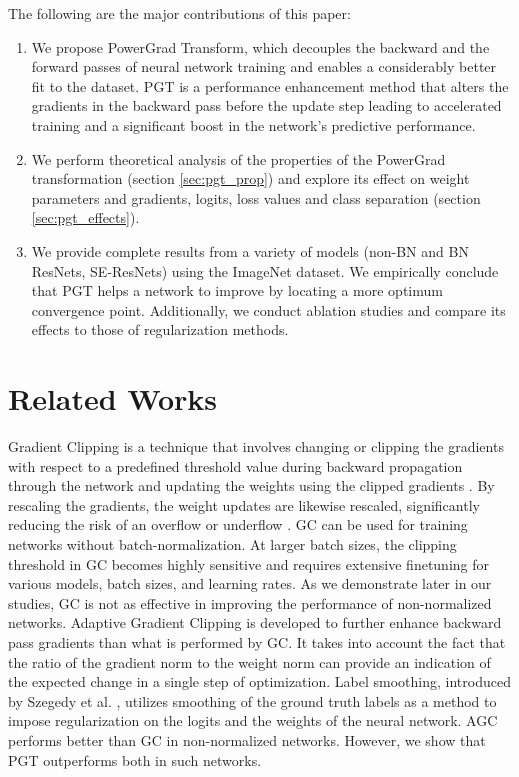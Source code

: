 \documentclass[runningheads]{llncs}
\begin{document}
The following are the major contributions of this paper:

\begin{enumerate}

\item We propose PowerGrad Transform, which decouples the backward and the forward
passes of neural network training and enables a considerably better fit to the dataset.
PGT is a performance enhancement method that alters the gradients in the backward pass
before the update step leading to accelerated training and a significant boost in the
network's predictive performance.

\item We perform theoretical analysis of the properties of the PowerGrad transformation
(section \ref{sec:pgt_prop}) and explore its effect on weight parameters and gradients,
logits, loss values and class separation (section \ref{sec:pgt_effects}).

\item We provide complete results from a variety of models (non-BN and BN ResNets,
SE-ResNets) using the ImageNet dataset. We empirically conclude that PGT helps a network
to improve by locating a more optimum convergence point. Additionally, we conduct
ablation studies and compare its effects to those of regularization methods.

\end{enumerate}

\section{Related Works}
\label{sec:Rela}


Gradient Clipping \cite{pascanu2013difficulty} is a technique that involves changing or
clipping the gradients with respect to a predefined threshold value during backward
propagation through the network and updating the weights using the clipped gradients
\cite{zhang2019gradient}\cite{smith2020generalization}. By rescaling the gradients, the
weight updates are likewise rescaled, significantly reducing the risk of an overflow or
underflow \cite{pascanu2012understanding}. GC can be used for training networks without
batch-normalization. At larger batch sizes, the clipping threshold in GC becomes highly
sensitive and requires extensive finetuning for various models, batch sizes, and
learning rates. As we demonstrate later in our studies, GC is not as effective in
improving the performance of non-normalized networks. Adaptive Gradient Clipping
\cite{brock2021high} is developed to further enhance backward pass gradients than what
is performed by GC. It takes into account the fact that the ratio of the gradient norm
to the weight norm can provide an indication of the expected change in a single step of
optimization. Label smoothing, introduced by Szegedy et al.
\cite{szegedy2016rethinking}, utilizes smoothing of the ground truth labels as a method
to impose regularization on the logits and the weights of the neural network. AGC
performs better than GC in non-normalized networks. However, we show that PGT
outperforms both in such networks.
\end{document}
